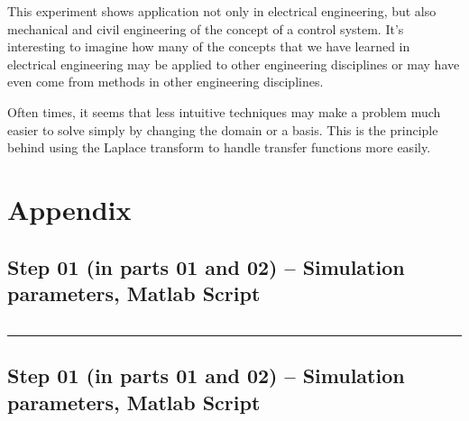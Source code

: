 \documentclass[12pt]{article}
\def\hr{{\par\noindent\rule{\textwidth}{0.4pt}}}
\begin{document}
This experiment shows application not only in electrical engineering, but also mechanical and civil engineering of the concept of a control system.
It's interesting to imagine how many of the concepts that we have learned in electrical engineering may be applied to other engineering disciplines or may have even come from methods in other engineering disciplines.

Often times, it seems that less intuitive techniques may make a problem much easier to solve simply by changing the domain or a basis.
This is the principle behind using the Laplace transform to handle transfer functions more easily.

\newpage
\appendix
\section{Appendix}

\subsection{Step 01 (in parts 01 and 02) -- Simulation parameters, Matlab Script}\label{sap:simulation params}
\inputminted{matlab}{step01_simulation_params.m}

\hr

\subsection{Step 01 (in parts 01 and 02) -- Simulation parameters, Matlab Script}
\inputminted{matlab}{step01_simulation_params.m}
\end{document}
